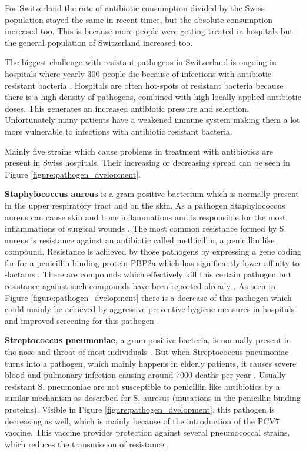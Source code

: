 For Switzerland the rate of antibiotic consumption divided by the Swiss population stayed the same in recent times, but the absolute consumption increased too. This is because more people were getting treated in hospitals \cite{swiss_hospitals} but the general population of Switzerland increased too.

The biggest challenge with resistant pathogens in Switzerland is ongoing in hospitals where yearly 300 people die because of infections with antibiotic resistant bacteria \cite{noauthor_fast_2018}. Hospitals are often hot-spots of resistant bacteria because there is a high density of  pathogens, combined with high locally applied antibiotic doses. This generates an increased antibiotic pressure and selection. Unfortunately many patients have a weakened immune system making them a lot more vulnerable to infections with antibiotic resistant bacteria.


Mainly five strains which cause problems in treatment with antibiotics are present in Swiss hospitals. Their increasing or decreasing spread can be seen in Figure \ref{figure:pathogen_dvelopment}\cite{swiss_hospitals}. 

\textbf{Staphylococcus aureus} is a gram-positive bacterium which is normally present in the upper respiratory tract and on the skin. As a pathogen Staphylococcus aureus can cause skin and bone inflammations and is responsible for the most inflammations of surgical wounds \cite{tong_staphylococcus_2015}. The most common resistance formed by S. aureus is resistance against an antibiotic called methicillin, a penicillin like compound. Resistance is achieved by those pathogens by expressing a gene coding for for a penicillin binding protein PBP2a which has significantly lower affinity to \textbeta-lactams \cite{peacock_mechanisms_2015}.  There are compounds which effectively kill this certain pathogen but resistance against such compounds have been reported already \cite{ventola_antibiotic_2015}. As seen in Figure \ref{figure:pathogen_dvelopment} there is a decrease of this pathogen which could mainly be achieved by aggressive preventive hygiene measures in hospitals and improved screening for this pathogen \cite{ventola_antibiotic_2015}\cite{swiss_hospital}. 

\textbf{Streptococcus pneumoniae}, a gram-positive bacteria, is normally present in the nose and throat of most individuals \cite{ventola_antibiotic_2015}. But when Streptococcus pneumoniae turns into a pathogen, which mainly happens in elderly patients, it causes severe blood and pulmonary infection causing around 7000 deaths per year \cite{ventola_antibiotic_2015e}. Usually resistant S. pneumoniae are not susceptible to penicillin like antibiotics by a similar mechanism as described for S. auresus (mutations in the penicillin binding proteins). Visible in Figure \ref{figure:pathogen_dvelopment}, this pathogen is decreasing as well, which is mainly because of the introduction of the PCV7 vaccine. This vaccine provides protection against several pneumococcal strains, which reduces the transmission of resistance \cite{ventola_antibiotic_2015}. 

